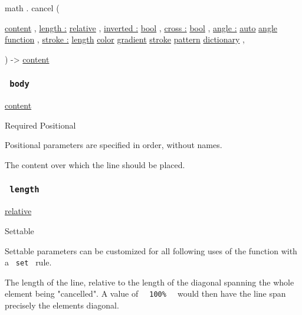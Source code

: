 math { . } { cancel } (

{ \href{/docs/reference/foundations/content/}{content} , } {
\hyperref[parameters-length]{length :}
\href{/docs/reference/layout/relative/}{relative} , } {
\hyperref[parameters-inverted]{inverted :}
\href{/docs/reference/foundations/bool/}{bool} , } {
\hyperref[parameters-cross]{cross :}
\href{/docs/reference/foundations/bool/}{bool} , } {
\hyperref[parameters-angle]{angle :}
\href{/docs/reference/foundations/auto/}{auto}
\href{/docs/reference/layout/angle/}{angle}
\href{/docs/reference/foundations/function/}{function} , } {
\hyperref[parameters-stroke]{stroke :}
\href{/docs/reference/layout/length/}{length}
\href{/docs/reference/visualize/color/}{color}
\href{/docs/reference/visualize/gradient/}{gradient}
\href{/docs/reference/visualize/stroke/}{stroke}
\href{/docs/reference/visualize/pattern/}{pattern}
\href{/docs/reference/foundations/dictionary/}{dictionary} , }

) -\textgreater{} \href{/docs/reference/foundations/content/}{content}

\subsubsection{\texorpdfstring{\texttt{\ body\ }}{ body }}\label{parameters-body}

\href{/docs/reference/foundations/content/}{content}

{Required} {{ Positional }}

\label{parameters-body-positional-tooltip}
Positional parameters are specified in order, without names.

The content over which the line should be placed.

\subsubsection{\texorpdfstring{\texttt{\ length\ }}{ length }}\label{parameters-length}

\href{/docs/reference/layout/relative/}{relative}

{{ Settable }}

\label{parameters-length-settable-tooltip}
Settable parameters can be customized for all following uses of the
function with a \texttt{\ set\ } rule.

The length of the line, relative to the length of the diagonal spanning
the whole element being "cancelled". A value of
\texttt{\ }{\texttt{\ 100\%\ }}\texttt{\ } would then have the line span
precisely the element\textquotesingle s diagonal.

